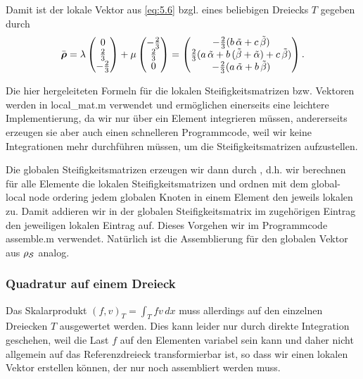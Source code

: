Damit ist der lokale Vektor aus \eqref{eq:5.6} bzgl. eines beliebigen Dreiecks $T$ gegeben durch
\[
	\bar{\boldsymbol \rho} = \lambda \begin{pmatrix}
								0 \\
								\frac 23 \\
								-\frac 23
							\end{pmatrix}+\mu  \begin{pmatrix}
								-\frac 23 \\
								\frac 23 \\
								0
							\end{pmatrix} = \begin{pmatrix}
					-\frac 23 (b\, \tilde \alpha + c\, \tilde\beta) \\
								\frac 23 (a\, \tilde\alpha + b\, (\tilde \beta + \tilde \alpha) + c\, \tilde\beta) \\
								-\frac 23 (a\,  \tilde \alpha + b\,  \tilde \beta)
							\end{pmatrix}.
\]

Die hier hergeleiteten Formeln für die lokalen Steifigkeitsmatrizen bzw. Vektoren werden in {\ttfamily local_mat.m} verwendet und ermöglichen einerseits eine leichtere Implementierung, da wir nur über ein Element integrieren müssen, andererseits erzeugen sie aber auch einen schnelleren Programmcode, weil wir keine Integrationen mehr durchführen müssen, um die Steifigkeitsmatrizen aufzustellen.

Die globalen Steifigkeitsmatrizen erzeugen wir dann durch , d.h. wir berechnen für alle Elemente die lokalen Steifigkeitsmatrizen und ordnen mit dem global-local node ordering jedem globalen Knoten in einem Element den jeweils lokalen zu. Damit addieren wir in der globalen Steifigkeitsmatrix im zugehörigen Eintrag den jeweiligen lokalen Eintrag auf. Dieses Vorgehen wir im Programmcode {\ttfamily assemble.m} verwendet. Natürlich ist die Assemblierung für den globalen Vektor aus $\rho_{\mathcal S}$ analog.


\subsubsection{Quadratur auf einem Dreieck}

Das Skalarprodukt $(f,v)_T = \int_T fv \, dx$ muss allerdings auf den einzelnen Dreiecken $T$ ausgewertet werden. Dies kann leider nur durch direkte Integration geschehen, weil die Last $f$ auf den Elementen variabel sein kann und daher nicht allgemein auf das Referenzdreieck transformierbar ist, so dass wir einen lokalen Vektor erstellen können, der nur noch assembliert werden muss. 

